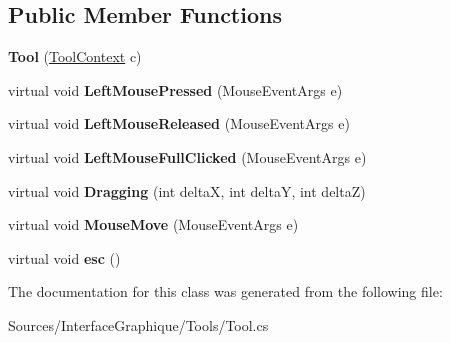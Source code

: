 \subsection*{Public Member Functions}
\begin{DoxyCompactItemize}
\item 
\hypertarget{class_interface_graphique_1_1_tools_1_1_tool_a6b0e1f3f499e859490b356cdc347edcb}{}{\bfseries Tool} (\hyperlink{class_interface_graphique_1_1_tools_1_1_tool_context}{Tool\+Context} c)\label{class_interface_graphique_1_1_tools_1_1_tool_a6b0e1f3f499e859490b356cdc347edcb}

\item 
\hypertarget{class_interface_graphique_1_1_tools_1_1_tool_ab2686191abbf151956e404d9c2191efb}{}virtual void {\bfseries Left\+Mouse\+Pressed} (Mouse\+Event\+Args e)\label{class_interface_graphique_1_1_tools_1_1_tool_ab2686191abbf151956e404d9c2191efb}

\item 
\hypertarget{class_interface_graphique_1_1_tools_1_1_tool_acf41104972d300372a1d7855bbe3dc39}{}virtual void {\bfseries Left\+Mouse\+Released} (Mouse\+Event\+Args e)\label{class_interface_graphique_1_1_tools_1_1_tool_acf41104972d300372a1d7855bbe3dc39}

\item 
\hypertarget{class_interface_graphique_1_1_tools_1_1_tool_a8d20408729212b49c6f2aa5e03f44fbe}{}virtual void {\bfseries Left\+Mouse\+Full\+Clicked} (Mouse\+Event\+Args e)\label{class_interface_graphique_1_1_tools_1_1_tool_a8d20408729212b49c6f2aa5e03f44fbe}

\item 
\hypertarget{class_interface_graphique_1_1_tools_1_1_tool_a8301f8474add500800641311c532d976}{}virtual void {\bfseries Dragging} (int delta\+X, int delta\+Y, int delta\+Z)\label{class_interface_graphique_1_1_tools_1_1_tool_a8301f8474add500800641311c532d976}

\item 
\hypertarget{class_interface_graphique_1_1_tools_1_1_tool_ab9ee6dad420362c01c719d0ee1af764c}{}virtual void {\bfseries Mouse\+Move} (Mouse\+Event\+Args e)\label{class_interface_graphique_1_1_tools_1_1_tool_ab9ee6dad420362c01c719d0ee1af764c}

\item 
\hypertarget{class_interface_graphique_1_1_tools_1_1_tool_abbdd9f5611d3e6e42e1145348d931bae}{}virtual void {\bfseries esc} ()\label{class_interface_graphique_1_1_tools_1_1_tool_abbdd9f5611d3e6e42e1145348d931bae}

\end{DoxyCompactItemize}


The documentation for this class was generated from the following file\+:\begin{DoxyCompactItemize}
\item 
Sources/\+Interface\+Graphique/\+Tools/Tool.\+cs\end{DoxyCompactItemize}
